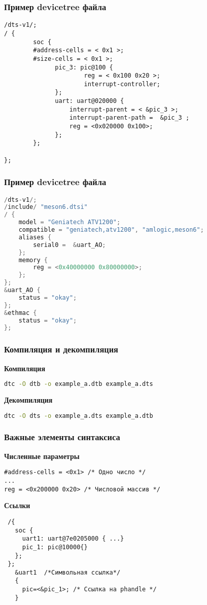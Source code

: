 \begin{frame}[fragile]
  \frametitle{Пример devicetree файла}
  \begin{lstlisting}
/dts-v1/;
/ {
        soc {
		#address-cells = < 0x1 >;
		#size-cells = < 0x1 >;
              pic_3: pic@100 {
                      reg = < 0x100 0x20 >;
                      interrupt-controller;
              };
              uart: uart@020000 {
                  interrupt-parent = < &pic_3 >;
                  interrupt-parent-path =  &pic_3 ;
                  reg = <0x020000 0x100>;
              };
        };

};
  \end{lstlisting}

\end{frame}
\begin{frame}[fragile]
  \frametitle{Пример devicetree файла}
  \begin{lstlisting}[language=C]
/dts-v1/;
/include/ "meson6.dtsi"
/ {
	model = "Geniatech ATV1200";
	compatible = "geniatech,atv1200", "amlogic,meson6";
	aliases {
		serial0 =  &uart_AO;
	};
	memory {
		reg = <0x40000000 0x80000000>;
	};
};
&uart_AO {
	status = "okay";
};
&ethmac {
	status = "okay";
};
  \end{lstlisting}
\end{frame}

\begin{frame}[fragile]
  \frametitle{Компиляция и декомпиляция}
  \begin{center}
    \textbf{Компиляция}
  \end{center}
  \begin{lstlisting}[language=bash]
dtc -O dtb -o example_a.dtb example_a.dts 
  \end{lstlisting}
  \begin{center}
    \textbf{Декомпиляция}
  \end{center}
  \begin{lstlisting}[language=bash]
dtc -O dts -o example_a.dts example_a.dtb
  \end{lstlisting}
\end{frame}

\begin{frame}[fragile]
  \frametitle{Важные элементы синтаксиса}
  \begin{center}
    \textbf{Численные параметры}
  \end{center}
\begin{lstlisting}
#address-cells = <0x1> /* Одно число */
...
reg = <0x200000 0x20> /* Числовой массив */
\end{lstlisting}
\end{frame}
\begin{frame}[fragile]
   \begin{center}
     \textbf{Ссылки}
   \end{center}  
\begin{lstlisting}
 /{
   soc {
     uart1: uart@7e0205000 { ...}
     pic_1: pic@10000{}
   };
 };
   &uart1  /*Символьная ссылка*/
   {
     pic=<&pic_1>; /* Ссылка на phandle */
   }
\end{lstlisting}
\end{frame}

